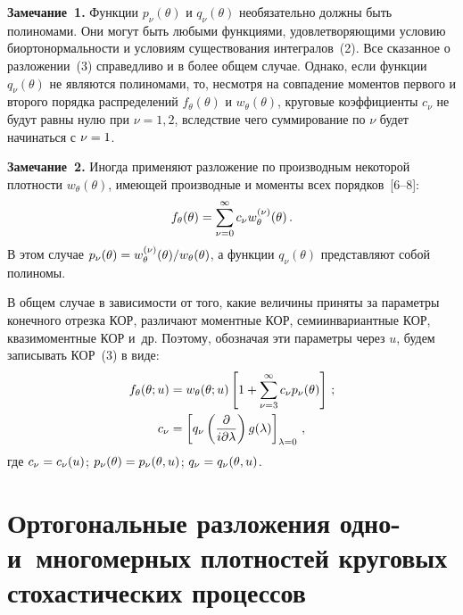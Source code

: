 \begin{multicols}{2}
\medskip

\noindent
\textbf{Замечание~1.} 
Функции $p_\nu(\theta)$ и $q_\nu (\theta)$
необязательно должны быть полиномами. Они могут быть любыми
функциями, удовлетворяющими условию биортонормальности и условиям
существования интегралов~(2). Все сказанное о разложении~(3)
справедливо и в более общем случае. Однако, если функции
$q_\nu(\theta)$ не являются полиномами, то, несмотря на совпадение
моментов первого и второго порядка распределений $f_\theta(\theta)$
и $w_\theta(\theta)$, круговые коэффициенты $c_\nu$ не будут равны
нулю при  $\nu=1,2$, вследствие чего суммирование по  $\nu$ будет
начинаться с $\nu\hm=1$.

\medskip

\noindent
\textbf{Замечание~2.} Иногда применяют разложение по производным некоторой плот\-ности 
$w_\theta(\theta)$, име\-ющей производные и моменты всех порядков~[6--8]:
    $$
    f_\theta(\theta) =\sum\limits_{\nu=0}^\infty c_\nu w_\theta^{(\nu)} (\theta)\,.
    $$
В этом случае $p_\nu (\theta) \hm= w_\theta^{(\nu)}(\theta)/w_\theta(\theta)$, 
а  функции  $q_\nu(\theta)$ представляют собой полиномы.

В общем случае в зависимости от того, какие величины приняты за
параметры конечного отрезка КОР, различают моментные КОР,
семиинвариантные КОР, квазимоментные КОР и~др. Поэтому, обозначая
эти параметры через $u$, будем записывать КОР~(3) в виде:
\begin{align*}
f_\theta(\theta;u)&= w_\theta(\theta;u) \left[ 1+ \sum\limits_{\nu=3}^\infty c_\nu 
p_\nu(\theta)\right]\,;\\
c_\nu &=\left[ q_\nu \left( \displaystyle\frac{\displaystyle \partial\mathstrut}{\displaystyle i\partial \lambda\mathstrut}\right) 
g(\lambda)\right]_{\lambda=0}\,,
\end{align*}
где $c_\nu\hm= c_\nu (u)$; $p_\nu (\theta) \hm=p_\nu (\theta,u)$; 
$q_\nu \hm= q_\nu (\theta, u)$.


\section{Ортогональные разложения одно- 
и~многомерных плотностей круговых стохастических процессов}


\end{multicols}
